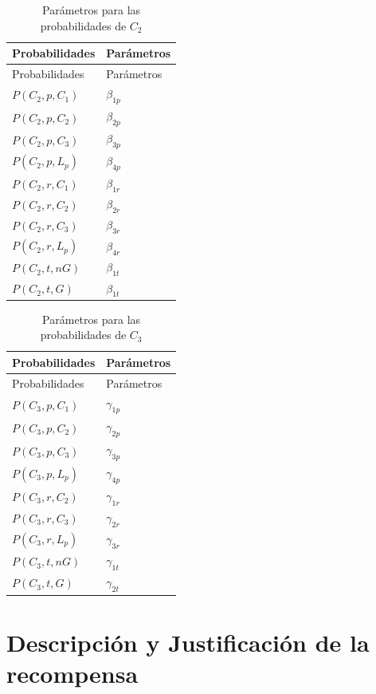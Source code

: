 \documentclass[
  us-letterpaper,
  DIV=11,
  numbers=noendperiod]{scrreprt}
\begin{document}
\begin{longtable}[]{@{}ll@{}}
\caption{Parámetros para las probabilidades de \(C_2\)}\tabularnewline
\toprule\noalign{}
Probabilidades & Parámetros \\
\midrule\noalign{}
\endfirsthead
\toprule\noalign{}
Probabilidades & Parámetros \\
\midrule\noalign{}
\endhead
\bottomrule\noalign{}
\endlastfoot
\(P(C_2,p,C_1)\) & \(\beta_{1p}\) \\
\(P(C_2,p,C_2)\) & \(\beta_{2p}\) \\
\(P(C_2,p,C_3)\) & \(\beta_{3p}\) \\
\(P(C_2,p,L_p)\) & \(\beta_{4p}\) \\
\(P(C_2,r,C_1)\) & \(\beta_{1r}\) \\
\(P(C_2,r,C_2)\) & \(\beta_{2r}\) \\
\(P(C_2,r,C_3)\) & \(\beta_{3r}\) \\
\(P(C_2,r,L_p)\) & \(\beta_{4r}\) \\
\(P(C_2,t,nG)\) & \(\beta_{1t}\) \\
\(P(C_2,t,G)\) & \(\beta_{1t}\) \\
\end{longtable}

\begin{longtable}[]{@{}ll@{}}
\caption{Parámetros para las probabilidades de \(C_3\)}\tabularnewline
\toprule\noalign{}
Probabilidades & Parámetros \\
\midrule\noalign{}
\endfirsthead
\toprule\noalign{}
Probabilidades & Parámetros \\
\midrule\noalign{}
\endhead
\bottomrule\noalign{}
\endlastfoot
\(P(C_3,p,C_1)\) & \(\gamma_{1p}\) \\
\(P(C_3,p,C_2)\) & \(\gamma_{2p}\) \\
\(P(C_3,p,C_3)\) & \(\gamma_{3p}\) \\
\(P(C_3,p,L_p)\) & \(\gamma_{4p}\) \\
\(P(C_3,r,C_2)\) & \(\gamma_{1r}\) \\
\(P(C_3,r,C_3)\) & \(\gamma_{2r}\) \\
\(P(C_3,r,L_p)\) & \(\gamma_{3r}\) \\
\(P(C_3,t,nG)\) & \(\gamma_{1t}\) \\
\(P(C_3,t,G)\) & \(\gamma_{2t}\) \\
\end{longtable}


\chapter{Descripción y Justificación de la
recompensa}\label{descripciuxf3n-y-justificaciuxf3n-de-la-recompensa}
\end{document}
